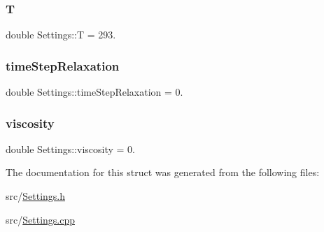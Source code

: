 \mbox{\label{structSettings_a255c7c5f048ccaeb00206462d3530240}} 
\subsubsection{\texorpdfstring{T}{T}}
{\footnotesize\ttfamily double Settings\+::T = 293.}

\mbox{\label{structSettings_ab186bb6f0f6ce1f234e5ab5a221c838d}} 
\subsubsection{\texorpdfstring{timeStepRelaxation}{timeStepRelaxation}}
{\footnotesize\ttfamily double Settings\+::time\+Step\+Relaxation = 0.}

\mbox{\label{structSettings_a96d99822c1bf7f6b025c93546c1c2a3a}} 
\subsubsection{\texorpdfstring{viscosity}{viscosity}}
{\footnotesize\ttfamily double Settings\+::viscosity = 0.}



The documentation for this struct was generated from the following files\+:\begin{DoxyCompactItemize}
\item 
src/\mbox{\hyperlink{Settings_8h}{Settings.\+h}}\item 
src/\mbox{\hyperlink{Settings_8cpp}{Settings.\+cpp}}\end{DoxyCompactItemize}
